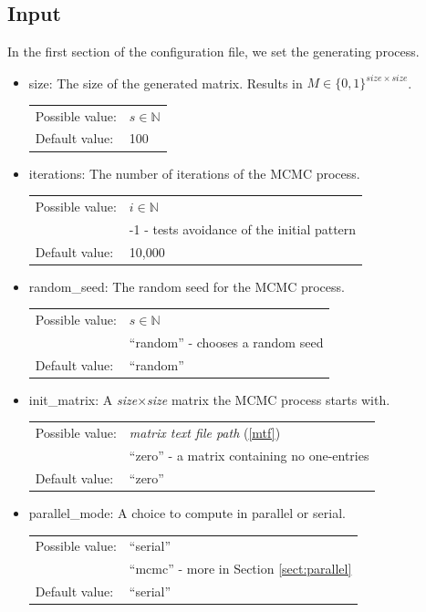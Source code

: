 \subsection{Input}
In the first section of the configuration file, we set the generating process.
\begin{itemize}
\item size: The size of the generated matrix. Results in $M\in\{0,1\}^{size\times size}$.

\begin{tabular}{ll}
Possible value: & $s\in\mathbb{N}$ \\
Default value: & 100
\end{tabular}

\item iterations: The number of iterations of the MCMC process.

\begin{tabular}{ll}
Possible value: & $i\in\mathbb{N}$ \\
& -1 - tests avoidance of the initial pattern \\
Default value: & 10,000
\end{tabular}

\item random\_seed: The random seed for the MCMC process.

\begin{tabular}{ll}
Possible value: & $s\in\mathbb{N}$ \\
& ``random'' - chooses a random seed \\
Default value: & ``random''
\end{tabular}

\item init\_matrix: A \textit{size}$\times$\textit{size} matrix the MCMC process starts with.

\begin{tabular}{ll}
Possible value: & \textit{matrix text file path} (\ref{mtf}) \\
& ``zero'' - a matrix containing no one-entries \\
Default value: & ``zero''
\end{tabular}

\item parallel\_mode: A choice to compute in parallel or serial.

\begin{tabular}{ll}
Possible value: & ``serial'' \\
& ``mcmc'' - more in Section \ref{sect:parallel} \\
Default value: & ``serial''
\end{tabular}


\end{itemize}
